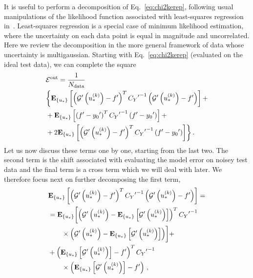 It is useful to perform a decomposition of Eq.~\ref{eq:chi2kerep}, following
usual manipulations of the likelihood function associated with least-squares
regression in~\cite{mlforphysics}. Least-squares regression is a special case of
minimum likelihood estimation, where the uncertainty on each data point is equal
in magnitude and uncorrelated. Here we review the decomposition in the more
general framework of data whose uncertainty is multigaussian. Starting with
Eq.~\ref{eq:chi2kerep} (evaluated on the ideal test data), we can complete the
square
\begin{align}
    \label{eq:EoutDecomposition}
        &\mathcal{E}^{\rm out} = \frac{1}{N_{\rm data}} \nonumber \\ 
        &\biggl\{ \mathbf{E}_{\{ u_* \}} \left[ 
            \left( {{\mathcal{G}}^{\prime}}\left(u_*^{(k)}\right) - {{f}^{\prime}} \right)^T
            {{C_{Y}}^{\prime}}^{-1}
            \left( {{\mathcal{G}}^{\prime}}\left(u_*^{(k)}\right) - {{f}^{\prime}} \right)
         \right] + \nonumber\\
        &+ \mathbf{E}_{\{ u_* \}} \left[ 
            \left( {{f}^{\prime}} - {{y_0}^{\prime}} \right)^T
            {{C_{Y}}^{\prime}}^{-1}
            \left( {{f}^{\prime}} - {{y_0}^{\prime}} \right)
         \right]+ \nonumber\\
        &+ 2 \mathbf{E}_{\{ u_* \}} \left[ 
            \left( {{\mathcal{G}}^{\prime}}\left(u_*^{(k)}\right) - {{f}^{\prime}} \right)^T
            {{C_{Y}}^{\prime}}^{-1}
            \left({{f}^{\prime}} - {{y_0}^{\prime}} \right)
         \right]\biggr\}\, .
\end{align}
Let us now discuss these terms one by one, starting from the last two. The
second term is the shift associated with evaluating the model error on noisey
test data and the final term is a cross term which we will deal with later. We
therefore focus next on further decomposing the first term,
\begin{equation}
    \begin{split}
        &\mathbf{E}_{\{ u_* \}} \left[ 
            \left( {{\mathcal{G}}^{\prime}}\left(u_*^{(k)}\right) - {{f}^{\prime}} \right)^T
            {{C_{Y}}^{\prime}}^{-1}
            \left( {{\mathcal{G}}^{\prime}}\left(u_*^{(k)}\right) - {{f}^{\prime}} \right)
         \right] = \\
        &= \mathbf{E}_{\{ u_* \}} \biggl[
            \left( {{\mathcal{G}}^{\prime}}\left(u_*^{(k)}\right) - 
            \mathbf{E}_{\{ u_* \}} \left[ {{\mathcal{G}}^{\prime}}\left(u_*^{(k)}\right) \right] \right)^T
            {{C_{Y}}^{\prime}}^{-1} \\
            &\quad\quad\times\left( {{\mathcal{G}}^{\prime}}\left(u_*^{(k)}\right) - 
            \mathbf{E}_{\{ u_* \}} \left[ {{\mathcal{G}}^{\prime}}\left(u_*^{(k)}\right) \right] \right)
         \biggr]+ \\
        &+ \left( \mathbf{E}_{\{ u_* \}} \left[ {{\mathcal{G}}^{\prime}}\left(u_*^{(k)}\right) \right] - {{f}^{\prime}} \right)^T
        {{C_{Y}}^{\prime}}^{-1}\\
        &\quad\quad\times\left( \mathbf{E}_{\{ u_* \}} \left[ {{\mathcal{G}}^{\prime}}\left(u_*^{(k)}\right) \right] - {{f}^{\prime}} \right)\, ,
    \end{split}
\end{equation}
